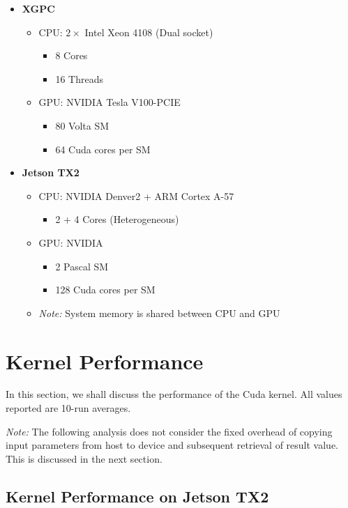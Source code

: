 \documentclass[a4paper,12pt]{article}
\begin{document}
\begin{itemize}
  \item \textbf{XGPC}
  \begin{itemize}
    \item CPU: $2 \times$ Intel Xeon 4108 (Dual socket)
    \begin{itemize}
      \item 8 Cores
      \item 16 Threads
    \end{itemize}
    \item GPU: NVIDIA Tesla V100-PCIE
    \begin{itemize}
      \item 80 Volta SM
      \item 64 Cuda cores per SM
    \end{itemize}
  \end{itemize}
  \item \textbf{Jetson TX2}
  \begin{itemize}
    \item CPU: NVIDIA Denver2 + ARM Cortex A-57
    \begin{itemize}
      \item 2 + 4 Cores (Heterogeneous)
    \end{itemize}
    \item GPU: NVIDIA
    \begin{itemize}
      \item 2 Pascal SM
      \item 128 Cuda cores per SM
    \end{itemize}
    \item \textit{Note:} System memory is shared between CPU and GPU
  \end{itemize}
\end{itemize}

\section{Kernel Performance}

In this section, we shall discuss the performance of the Cuda kernel. All values reported are 10-run averages.

\textit{Note:} The following analysis does not consider the fixed overhead of copying input parameters from host to device and subsequent retrieval of result value. This is discussed in the next section.

\subsection{Kernel Performance on Jetson TX2}
\end{document}

